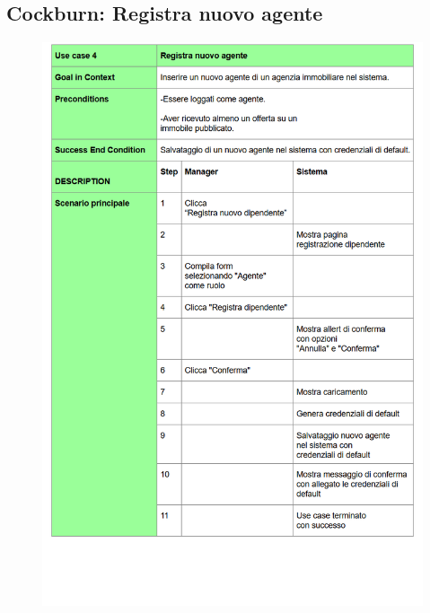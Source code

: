\subsection{Cockburn: Registra nuovo agente} 

\begin{figure}[H]
	\centering
	\includegraphics[width=1\linewidth]{"Immagini/cockburn/registra nuovo agente principale.png"}
	\caption[CockBurn extensions: registra nuovo agente]{}
	\label{fig:registra-nuovo-agente-extensions}
\end{figure}

\newpage

